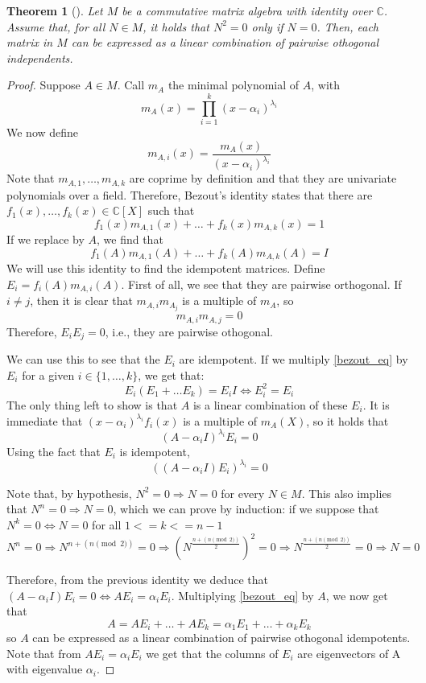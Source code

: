 \documentclass[a4paper,12pt]{article}
\theoremstyle{plain}
\newtheorem{theorem}{Theorem}
\theoremstyle{definition}
\theoremstyle{remark}
\begin{document}
\begin{theorem}[{\parencite[Theorem 3.4.1]{godsil_erdoskorado_2015}}]
    Let $ M $ be a commutative matrix algebra with identity over $ \mathbb{C} $.
    Assume that, for all $ N \in M $, it holds that $ N^2 = 0 $ only if $ N = 0 $.
    Then, each matrix in $ M $ can be expressed as a linear combination of
    pairwise othogonal independents.
    \label{th:ekr_commutative}
\end{theorem}
\begin{proof}
    Suppose $ A \in M $. Call $ m_A $ the minimal polynomial of $ A $, with
    \[ m_A(x) = \prod_{ i=1 }^{ k } (x-\alpha_i)^{\lambda_i} \]
    We now define
    \[ m_{A,i}(x) = \frac{m_A(x)}{(x-\alpha_i)^{\lambda_i}} \]
    Note that $ m_{A,1}, \dots, m_{A,k} $ are coprime by definition and that they
    are univariate polynomials over a field. Therefore, Bezout's identity states that
    there are $ f_1(x), \dots, f_k(x) \in \mathbb{C}[X] $ such that
    \[ f_1(x)m_{A,1}(x) + \dots + f_k(x)m_{A,k}(x) = 1 \]
    If we replace by $ A $, we find that
    \begin{equation}
        f_1(A)m_{A,1}(A) + \dots + f_k(A)m_{A,k}(A) = I
        \label{bezout_eq}
    \end{equation}
    We will use this identity to find the idempotent matrices. Define
    $ E_i = f_i(A)m_{A,i}(A) $. First of all, we see that they are pairwise orthogonal.
    If $ i \neq j $, then it is clear that $ m_{A,i}m_{A_j} $ is a
    multiple of $ m_A $, so
    \[ m_{A,i}m_{A,j} = 0 \]
    Therefore, $ E_iE_j = 0 $, i.e., they are pairwise othogonal.

    We can use this to see that the $ E_i $ are idempotent. If we multiply
    \ref{bezout_eq} by $ E_i $ for a given $ i \in \{ 1,\dots,k \} $, we get that:
    \[ E_i(E_1 + \dots E_k) = E_iI \iff E_i^2 = E_i \]
    The only thing left to show is that $ A $ is a linear combination of these $ E_i $.
    It is immediate that $ (x-\alpha_i)^{\lambda_i}f_i(x) $ is a multiple of $ m_A(X) $,
    so it holds that
    \[ (A-\alpha_iI)^{\lambda_i}E_i = 0 \]
    Using the fact that $ E_i $ is idempotent,
    \[ ((A-\alpha_iI)E_i)^{\lambda_i} = 0 \]

    Note that, by hypothesis, $ N^2 = 0 \Rightarrow N = 0 $ for every $ N \in M $.
    This also implies that $ N^n = 0 \Rightarrow N = 0 $, which we can prove by
    induction: if we suppose that $ N^{k} = 0 \iff N = 0 $ for all $ 1 <= k <= n-1 $
    \[ N^n = 0 \Rightarrow N^{n + (n\pmod{2})} = 0 \Rightarrow (N^{\frac{n+(n\pmod{2})}{2}})^2 = 0
    \Rightarrow N^{\frac{n+(n\pmod{2})}{2}} = 0 \Rightarrow N = 0 \]

    Therefore, from the previous identity we deduce that $ (A-\alpha_iI)E_i = 0
    \iff A E_i = \alpha_i E_i$. Multiplying \ref{bezout_eq} by $ A $, we now get
    that
    \[ A = AE_i + \dots + AE_k = \alpha_1 E_1 + \dots + \alpha_k E_k \]
    so $ A $ can be expressed as a linear combination of pairwise othogonal
    idempotents. Note that from $ AE_i = \alpha_i E_i $ we get that the columns of
    $ E_i $ are eigenvectors of A with eigenvalue $ \alpha_i $.

\end{proof}
\end{document}
